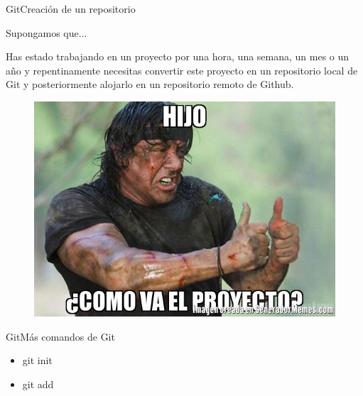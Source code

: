 \documentclass[10pt]{beamer}
\begin{document}
\begin{frame}{Git}{Creación de un repositorio}

\begin{block}{Supongamos que...}

Has estado trabajando en un proyecto por una hora, una semana, un mes o un año y repentinamente necesitas convertir este proyecto en un repositorio local de Git y posteriormente alojarlo en un repositorio remoto de Github.

\begin{figure}[h!]
\centering
\includegraphics [scale=0.26]{elproyecto}
\label{fig:gitclone}
\end{figure}

\end{block}

\end{frame}

\begin{frame}{Git}{Más comandos de Git}

\begin{block}{}

\begin{itemize}
        \item git init
        \item git add
\end{itemize}
    
\end{block}

\end{frame}
\end{document}
